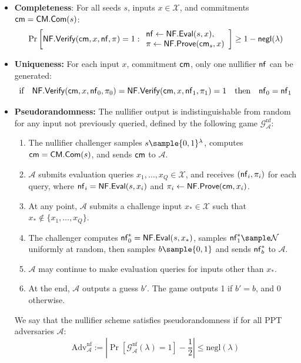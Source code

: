 \begin{itemize}
    \item \textbf{Completeness}: For all seeds $s$, inputs $x \in \mathcal{X}$, and commitments $\mathsf{cm} = \mathsf{CM.Com}(s)$:
    \[
    \Pr\left[ \mathsf{NF.Verify}(\mathsf{cm}, x, \mathsf{nf}, \pi) = 1 :  
    \begin{array}{l}
    \mathsf{nf} \gets \mathsf{NF.Eval}(s,x), \\
    \pi \gets \mathsf{NF.Prove}(\mathsf{cm}_s, x)
    \end{array}
    \right] \geq 1-\mathsf{negl}(\lambda)
    \]

    \item \textbf{Uniqueness:} For each input $x$, commitment $\mathsf{cm}$, only one nullifier $\mathsf{nf}$ can be generated:
    \[
    \text{if} \quad \mathsf{NF.Verify}(\mathsf{cm}, x, \mathsf{nf}_0, \pi_0) = \mathsf{NF.Verify}(\mathsf{cm}, x, \mathsf{nf}_1, \pi_1) = 1 \quad \text{then} \quad \mathsf{nf}_0 = \mathsf{nf}_1
    \]

    \item \textbf{Pseudorandomness:} The nullifier output is indistinguishable from random for any input not previously queried, defined by the following game $\mathcal{G}_{\mathcal{A}}^{\text{nf}}$:
    \begin{enumerate}
        \item The nullifier challenger samples $s \sample \{0,1\}^\lambda$, computes $\mathsf{cm} = \mathsf{CM.Com}(s)$, and sends $\mathsf{cm}$ to $\mathcal{A}$.
        \item $\mathcal{A}$ submits evaluation queries $x_1, \ldots, x_Q \in \mathcal{X}$, and receives $(\mathsf{nf}_i, \pi_i)$ for each query, where $\mathsf{nf}_i = \mathsf{NF.Eval}(s, x_i)$ and $\pi_i \leftarrow \mathsf{NF.Prove}(\mathsf{cm}, x_i)$.
        \item At any point, $\mathcal{A}$ submits a challenge input $x_* \in \mathcal{X}$ such that $x_* \not\in \{x_1, \ldots, x_Q\}$.
        \item The challenger computes $\mathsf{nf}_0^* = \mathsf{NF.Eval}(s, x_*)$, samples $\nf_1^* \sample \mathcal{N}$ uniformly at random, then samples $b \sample \{0,1\}$ and sends $\mathsf{nf}_b^*$ to $\mathcal{A}$.
        \item $\mathcal{A}$ may continue to make evaluation queries for inputs other than $x_*$.
        \item At the end, $\mathcal{A}$ outputs a guess $b'$. The game outputs 1 if $b' = b$, and 0 otherwise.
    \end{enumerate}
    
    We say that the nullifier scheme satisfies pseudorandomness if for all PPT adversaries $\mathcal{A}$:
    \[
    \text{Adv}_{\mathcal{A}}^{\text{nf}} := \left|\Pr\left[\mathcal{G}_{\mathcal{A}}^{\text{nf}}(\lambda) = 1\right] - \frac{1}{2}\right| \leq \text{negl}(\lambda)
    \]
    
\end{itemize}


